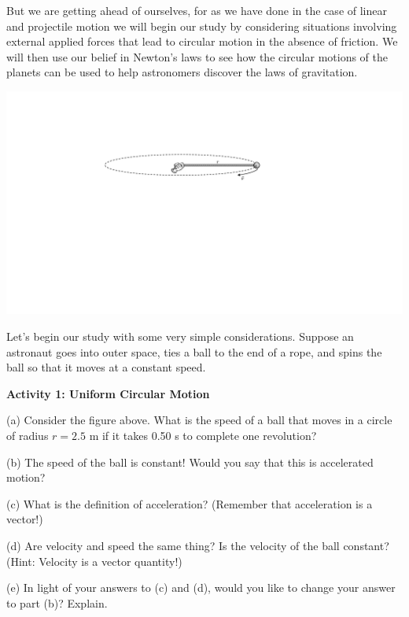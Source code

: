 But we are getting ahead of ourselves, for as we have done in the case of linear
and projectile motion we will begin our study by considering situations involving
external applied forces that lead to circular motion in the absence of friction.
We will then use our belief in Newton's laws to see how the circular motions
of the planets can be used to help astronomers discover the laws of gravitation.

\vspace{0.3cm}
{\par\centering \includegraphics{centripetal/centripetal_fig2_new.pdf} \par}
\vspace{0.3cm}

Let's begin our study with some very simple considerations. Suppose an astronaut
goes into outer space, ties a ball to the end of a rope, and spins the ball
so that it moves at a constant speed.

\textbf{Activity 1: Uniform Circular Motion }

(a) Consider the figure above. What is the speed of a ball that moves in a circle
of radius $r = 2.5$ m if it takes 0.50 s to complete one revolution?
\answerspace{20mm}

(b) The speed of the ball is constant! Would you say that this is accelerated
motion?
\answerspace{20mm}

(c) What is the definition of acceleration? (Remember that acceleration is a
vector!)
\answerspace{20mm}

(d) Are velocity and speed the same thing? Is the velocity of the ball constant?
(Hint: Velocity is a vector quantity!)
\answerspace{20mm}

(e) In light of your answers to (c) and (d), would you like to change your answer
to part (b)? Explain.
\answerspace{20mm}

